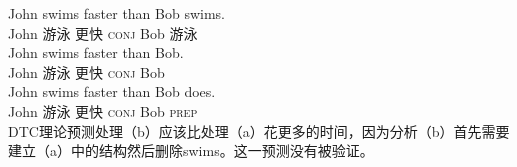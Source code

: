 %
\eal
\ex 
\gll John swims faster than Bob swims.\\
    John 游泳 更快 \textsc{conj} Bob 游泳\\
\ex 
\gll John swims faster than Bob.\\
    John 游泳 更快 \textsc{conj} Bob \\
\ex 
\gll John swims faster than Bob does.\\
    John 游泳 更快 \textsc{conj} Bob \textsc{prep}\\
\zl
DTC理论预测处理（b）应该比处理（a）花更多的时间，因为分析（b）首先需要建立（a）中的结构然后删除swims。这一预测没有被验证。

